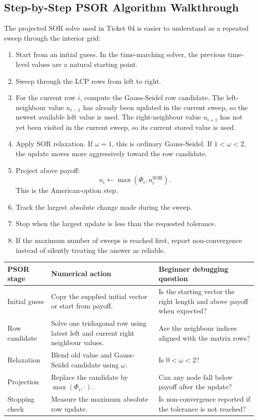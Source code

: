 \documentclass[11pt,a4paper]{article}
\begin{document}
\subsection{Step-by-Step PSOR Algorithm Walkthrough}

The projected SOR solve used in Ticket 04 is easier to understand as a repeated sweep through the
interior grid:
\begin{enumerate}
  \item Start from an initial guess. In the time-marching solver, the previous time-level values
        are a natural starting point.
  \item Sweep through the LCP rows from left to right.
  \item For the current row \(i\), compute the Gauss-Seidel row candidate. The left-neighbour
        value \(u_{i-1}\) has already been updated in the current sweep, so the newest available
        left value is used. The right-neighbour value \(u_{i+1}\) has not yet been visited in the
        current sweep, so its current stored value is used.
  \item Apply SOR relaxation. If \(\omega=1\), this is ordinary Gauss-Seidel. If
        \(1<\omega<2\), the update moves more aggressively toward the row candidate.
  \item Project above payoff:
        \[
          u_i \leftarrow \max(\Phi_i,u_i^{\mathrm{SOR}}).
        \]
        This is the American-option step.
  \item Track the largest absolute change made during the sweep.
  \item Stop when the largest update is less than the requested tolerance.
  \item If the maximum number of sweeps is reached first, report non-convergence instead of
        silently treating the answer as reliable.
\end{enumerate}

\begin{longtable}{L{0.20\textwidth}L{0.34\textwidth}L{0.34\textwidth}}
\toprule
PSOR stage & Numerical action & Beginner debugging question \\
\midrule
\endhead
Initial guess & Copy the supplied initial vector or start from payoff. & Is the starting vector the
right length and above payoff when expected? \\
Row candidate & Solve one tridiagonal row using latest left and current right neighbour values. &
Are the neighbour indices aligned with the matrix rows? \\
Relaxation & Blend old value and Gauss-Seidel candidate using \(\omega\). & Is
\(0<\omega<2\)? \\
Projection & Replace the candidate by \(\max(\Phi_i,\cdot)\). & Can any node fall below payoff
after the update? \\
Stopping check & Measure the maximum absolute row update. & Is non-convergence reported if the
tolerance is not reached? \\
\bottomrule
\end{longtable}
\end{document}
